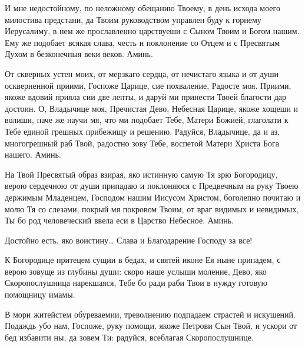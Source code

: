 И мне недостойному, по неложному обещанию Твоему, в день исхода моего милостива предстани, да Твоим руководством управлен буду к горнему Иерусалиму, в нем же прославленно царствуеши с Сыном Твоим и Богом нашим. Ему же подобает всякая слава, честь и поклонение со Отцем и с Пресвятым Духом в безконечныя веки веков. Аминь.

От скверных устен моих, от мерзкаго сердца, от нечистаго языка и от души оскверненной приими, Госпоже Царице, сие похваление, Радосте моя. Приими, якоже вдовий прияла сии две лепты, и даруй ми принести Твоей благости дар достоин. О, Владычице моя, Пречистая Дево, Небесная Царице, якоже хощеши и волиши, паче же научи мя, что ми подобает Тебе, Матери Божией, глаголати к Тебе единой грешных прибежищу и решению. Радуйся, Владычице, да и аз, многогрешный раб Твой, радостно зову Тебе, воспетой Матери Христа Бога нашего. Аминь.

На Твой Пресвятый образ взирая, яко истинную самую Тя зрю Богородицу, верою сердечною от души припадаю и поклоняюся с Предвечным на руку Твоею держимым Младенцем, Господом нашим Иисусом Христом, боголепно почитаю и молю Тя со слезами, покрый мя покровом Твоим, от враг видимых и невидимых, Ты бо род человеческий ввела еси в Царство Небесное. Аминь.




Достойно есть, яко воистину… Слава и Благодарение Господу за все!
\mychapterending

 




К Богородице притецем сущии в бедах, и святей иконе Ея ныне припадем, с верою зовуще из глубины души: скоро наше услыши моление, Дево, яко Скоропослушница нарекшаяся, Тебе бо ради раби Твои в нужду готовую помощницу имамы.




В мори житейстем обуреваемии, треволнению подпадаем страстей и искушений. Подаждь убо нам, Госпоже, руку помощи, якоже Петрови Сын Твой, и ускори от бед избавити ны, да зовем Ти: радуйся, всеблагая Скоропослушнице.




